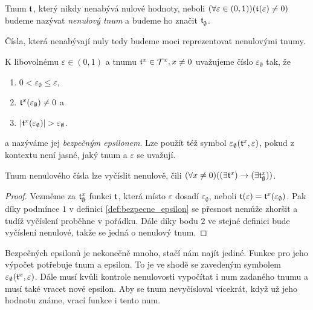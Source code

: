 \begin{definition}
Tnum $\mathfrak{t}^{}$, který nikdy nenabývá nulové hodnoty, neboli $(\forall \varepsilon \in (0,1))(\mathfrak{t}^{}(\varepsilon) \neq 0)$ budeme nazývat \textit{nenulový tnum} a budeme ho značit $\mathfrak{t}^{}_\emptyset$.
\end{definition}

Čísla, která nenabývají nuly tedy budeme moci reprezentovat nenulovými tnumy.

\begin{definition}\label{def:bezpecne_epsilon}
K libovolnému $\varepsilon\in (0,1)$ a tnumu $\mathfrak{t}^{x}\in\mathcal{T}^{x}, x\neq 0$ uvažujeme číslo $\varepsilon_\emptyset$ tak, že
\begin{enumerate}
\item{$0<\varepsilon_\emptyset\leq\varepsilon$},
\item{$\mathfrak{t}^{x}(\varepsilon_\emptyset) \neq 0$} a
\item{$|\mathfrak{t}^{x}(\varepsilon_\emptyset)| > \varepsilon_\emptyset$}.
\end{enumerate}
a nazýváme jej \textit{bezpečným epsilonem}. Lze použít též symbol $\varepsilon_\emptyset(\mathfrak{t}^{x},\varepsilon)$, pokud z kontextu není jasné, jaký tnum a $\varepsilon$ se uvažují.
\end{definition}

\begin{lemma}\label{vet:nenul}
Tnum nenulového čísla lze vyčíslit nenulově, čili $(\forall x \neq 0)((\exists \mathfrak{t}^{x}) \rightarrow (\exists \mathfrak{t}^{x}_\emptyset))$. 
\begin{proof}
Vezměme za $\mathfrak{t}^{x}_\emptyset$ funkci $\mathfrak{t}^{}$, která místo $\varepsilon$ dosadí $\varepsilon_\emptyset$, neboli $\mathfrak{t}^{}(\varepsilon) = \mathfrak{t}^{x}(\varepsilon_\emptyset)$. Pak díky podmínce $1$ v definici \ref{def:bezpecne_epsilon} se přesnost nemůže zhoršit a tudíž vyčíslení proběhne v pořádku. Dále díky bodu $2$ ve stejné definici bude vyčíslení nenulové, takže se jedná o nenulový tnum.
\end{proof}
\end{lemma}

Bezpečných epsilonů je nekonečně mnoho, stačí nám najít jediné. Funkce pro jeho výpočet potřebuje tnum a epsilon. To je ve shodě se zavedeným symbolem $\varepsilon_\emptyset(\mathfrak{t}^{x}, \varepsilon)$. Dále musí kvůli kontrole nenulovosti vypočítat i num zadaného tnumu a musí také vracet nové epsilon. Aby se tnum nevyčísloval vícekrát, když už jeho hodnotu známe, vrací funkce i tento num.

